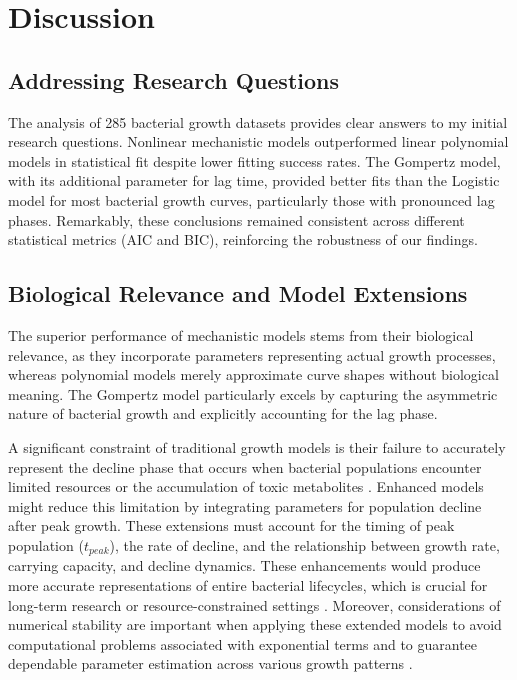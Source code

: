 \documentclass[11pt]{article}
\begin{document}
\section{Discussion}

\subsection{Addressing Research Questions}
The analysis of 285 bacterial growth datasets provides clear answers to my initial research questions. Nonlinear mechanistic models outperformed linear polynomial models in statistical fit despite lower fitting success rates. The Gompertz model, with its additional parameter for lag time, provided better fits than the Logistic model for most bacterial growth curves, particularly those with pronounced lag phases. Remarkably, these conclusions remained consistent across different statistical metrics (AIC and BIC), reinforcing the robustness of our findings.

\subsection{Biological Relevance and Model Extensions}
The superior performance of mechanistic models stems from their biological relevance, as they incorporate parameters representing actual growth processes, whereas polynomial models merely approximate curve shapes without biological meaning. The Gompertz model particularly excels by capturing the asymmetric nature of bacterial growth and explicitly accounting for the lag phase.

A significant constraint of traditional growth models is their failure to accurately represent the decline phase that occurs when bacterial populations encounter limited resources or the accumulation of toxic metabolites \citep{Biller2015}. Enhanced models might reduce this limitation by integrating parameters for population decline after peak growth. These extensions must account for the timing of peak population ($t_{peak}$), the rate of decline, and the relationship between growth rate, carrying capacity, and decline dynamics. These enhancements would produce more accurate representations of entire bacterial lifecycles, which is crucial for long-term research or resource-constrained settings \citep{Cusick2020}. Moreover, considerations of numerical stability are important when applying these extended models to avoid computational problems associated with exponential terms and to guarantee dependable parameter estimation across various growth patterns \citep{Fadeev2016}.
\end{document}
